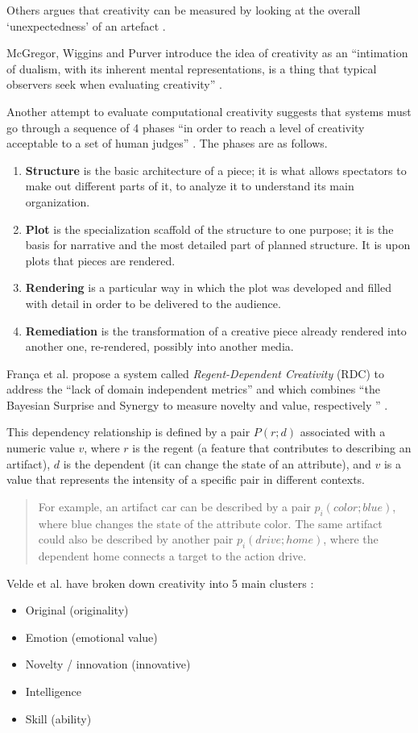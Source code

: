 Others argues that creativity can be measured by looking at the overall `unexpectedness' of an artefact \autocite{Kazjon2014}. 

McGregor, Wiggins and Purver introduce the idea of creativity as an ``intimation of dualism, with its inherent mental representations, is a thing that typical observers seek when evaluating creativity'' \autocite*{Mcgregor2014}.

Another attempt to evaluate computational creativity suggests that systems must go through a sequence of 4 phases ``in order to reach a level of creativity acceptable to a set of human judges'' \autocite{Negrete2014}. The phases are as follows.

\begin{enumerate}
  \item \textbf{Structure} is the basic architecture of a piece; it is what allows spectators to make out different parts of it, to analyze it to understand its main organization.
  \item \textbf{Plot} is the specialization scaffold of the structure to one purpose; it is the basis for narrative and the most detailed part of planned structure. It is upon plots that pieces are rendered.
  \item \textbf{Rendering} is a particular way in which the plot was developed and filled with detail in order to be delivered to the audience.
  \item \textbf{Remediation} is the transformation of a creative piece already rendered into another one, re-rendered, possibly into another media.
\end{enumerate}

Fran\c{c}a et al. propose a system called \textit{Regent-Dependent Creativity} (RDC) to address the ``lack of domain independent metrics'' and which combines ``the Bayesian Surprise and Synergy to measure novelty and value, respectively '' \autocite*{Franca2016}. 

This dependency relationship is defined by a pair $P(r; d)$ associated with a numeric value $v$, where $r$ is the regent (a feature that contributes to describing an artifact), $d$ is the dependent (it can change the state of an attribute), and $v$ is a value that represents the intensity of a specific pair in different contexts. 

\begin{quotation}
  For example, an artifact car can be described by a pair $p_i(color; blue)$, where blue changes the state of the attribute color. The same artifact could also be described by another pair $p_i(drive; home)$, where the dependent home connects a target to the action drive. 
\end{quotation}

Velde et al. have broken down creativity into 5 main clusters \autocite*{Velde2015}:

\begin{itemize}
  \item Original (originality)
  \item Emotion (emotional value)
  \item Novelty / innovation (innovative)
  \item Intelligence
  \item Skill (ability)
\end{itemize}






\stopcontents[chapters]
